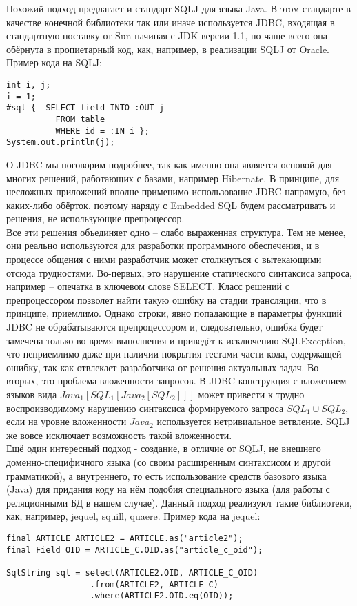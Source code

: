 \documentclass[12pt]{article}
\begin{document}
Похожий подход предлагает и стандарт SQLJ для языка Java. В этом стандарте в качестве конечной библиотеки так или иначе используется JDBC, входящая в стандартную поставку от Sun начиная с JDK версии 1.1, но чаще всего она обёрнута в пропиетарный код, как, например, в реализации SQLJ от Oracle. Пример кода на SQLJ:
\begin{lstlisting}
int i, j;
i = 1;
#sql {	SELECT field INTO :OUT j
          FROM table
          WHERE id = :IN i };
System.out.println(j);
\end{lstlisting}
О JDBC мы поговорим подробнее, так как именно она является основой для многих решений, работающих с базами, например Hibernate. В принципе, для несложных приложений вполне применимо использование JDBC напрямую, без каких-либо обёрток, поэтому наряду с Embedded SQL будем рассматривать и решения, не использующие препроцессор.\\

Все эти решения объединяет одно -- слабо выраженная структура. Тем не менее, они реально используются для разработки программного обеспечения, и в процессе общения с ними разработчик может столкнуться с вытекающими отсюда трудностями. Во-первых, это нарушение статического синтаксиса запроса, например -- опечатка в ключевом слове SELECT. Класс решений с препроцессором позволет найти такую ошибку на стадии трансляции, что в принципе, приемлимо. Однако строки, явно попадающие в параметры функций JDBC не обрабатываются препроцессором и, следовательно, ошибка будет замечена только во время выполнения и приведёт к исключению SQLException, что неприемлимо даже при наличии покрытия тестами части кода, содержащей ошибку, так как отвлекает разработчика от решения актуальных задач. Во-вторых, это проблема вложенности запросов. В JDBC конструкция с вложением языков вида $Java_1[SQL_1[Java_2[SQL_2]]]$ может привести к трудно воспроизводимому нарушению синтаксиса формируемого запроса $SQL_1 \cup SQL_2$, если на уровне вложенности $Java_2$ используется нетривиальное ветвление. SQLJ же вовсе исключает возможность такой вложенности.\\

Ещё один интересный подход - создание, в отличие от SQLJ, не внешнего доменно-специфичного языка (со своим расширенным синтаксисом и другой грамматикой), а внутреннего, то есть использование средств базового языка (Java) для придания коду на нём подобия специального языка (для работы с реляционными БД в нашем случае). Данный подход реализуют такие библиотеки, как, например, jequel, squill, quaere. Пример кода на jequel:
\begin{lstlisting}
final ARTICLE ARTICLE2 = ARTICLE.as("article2");
final Field OID = ARTICLE_C.OID.as("article_c_oid");

SqlString sql = select(ARTICLE2.OID, ARTICLE_C_OID)
                 .from(ARTICLE2, ARTICLE_C)
                 .where(ARTICLE2.OID.eq(OID));
\end{lstlisting}
\end{document}

